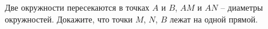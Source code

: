 \begin{ex}
	\begin{condition}
		Две окружности пересекаются в точках \( A \) и \( B \), \( AM \) и \( AN \) -- диаметры окружностей. Докажите, что точки \( M \), \( N \), \( B \) лежат на одной прямой.
	\end{condition}
\end{ex}